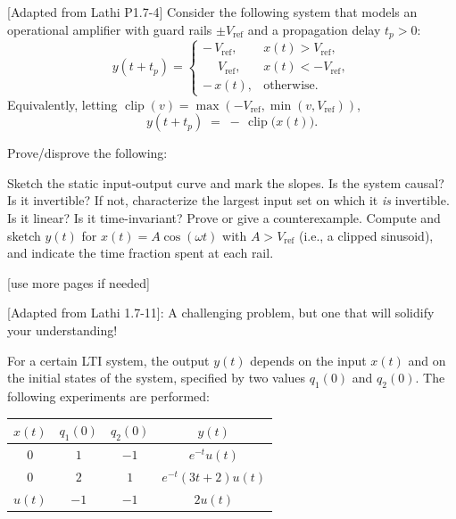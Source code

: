 \documentclass{ee102_pset}
\begin{document}
 [Adapted from Lathi P1.7-4] Consider the following system that models an operational amplifier with guard rails $\pm V_{\text{ref}}$ and a propagation delay $t_p>0$:
\[
y(t+t_p)=
\begin{cases}
-\,V_{\text{ref}}, & x(t)> V_{\text{ref}},\\[2pt]
\phantom{-}V_{\text{ref}}, & x(t)<-V_{\text{ref}},\\[2pt]
-\,x(t), & \text{otherwise}.
\end{cases}
\]
Equivalently, letting $\operatorname{clip}(v)=\max(-V_{\text{ref}},\min(v,V_{\text{ref}}))$,
\[
y(t+t_p) \;=\; -\,\operatorname{clip}\big(x(t)\big).
\]

Prove/disprove the following:

\problempart{\textbf{[5 points]}} Sketch the static input-output curve and mark the slopes.
\problempart{\textbf{[5 points]}} Is the system causal?
\problempart{\textbf{[5 points]}} Is it invertible? If not, characterize the largest input set on which it \emph{is} invertible.
\problempart{\textbf{[5 points]}} Is it linear? 
\problempart{\textbf{[5 points]}} Is it time-invariant? Prove or give a counterexample.
\problempart{\textbf{[5 points]}} Compute and sketch $y(t)$ for $x(t)=A\cos(\omega t)$ with $A>V_{\text{ref}}$ (i.e., a clipped sinusoid), and indicate the time fraction spent at each rail.


\vspace*{\fill}
\begin{center}
[use more pages if needed]
\end{center}
[Adapted from Lathi 1.7-11]: A challenging problem, but one that will solidify your understanding!

For a certain LTI system, the output $y(t)$ depends on the input $x(t)$
and on the initial states of the system, specified by two values
$q_1(0)$ and $q_2(0)$. The following experiments are performed:

\begin{center}
\begin{tabular}{c c c c}
\hline
$x(t)$ & $q_1(0)$ & $q_2(0)$ & $y(t)$ \\
\hline
$0$    & $1$  & $-1$ & $e^{-t}u(t)$ \\
$0$    & $2$  & $1$  & $e^{-t}(3t+2)u(t)$ \\
$u(t)$ & $-1$ & $-1$ & $2u(t)$ \\
\hline
\end{tabular}
\end{center}
\end{document}
